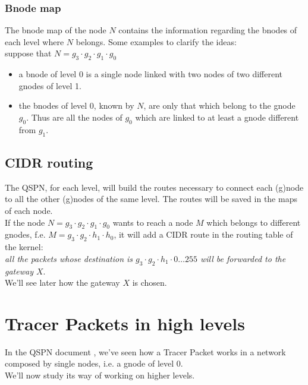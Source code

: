 \documentclass[a4paper]{article}
\begin{document}
\subsubsection{Bnode map}
The bnode map of the node $N$  contains the information regarding the bnodes
of each level where $N$ belongs.
Some examples to clarify the ideas:\\

suppose that $N = g_3\cdot g_2\cdot g_1 \cdot g_0$
\begin{itemize}
	\item a bnode of level 0 is a single node linked with two nodes of two
		different gnodes of level 1.
	\item the bnodes of level 0, known by $N$, are only that which belong
		to the gnode $g_0$. Thus are all the nodes of $g_0$ which are
		linked to at least a gnode different from $g_1$.
\end{itemize}

\subsection{CIDR routing}
The QSPN, for each level, will build the routes necessary to connect each
(g)node to all the other (g)nodes of the same level. The routes will be saved
in the maps of each node.\\

If the node $N=g_3\cdot g_2\cdot g_1 \cdot g_0$ wants to reach a node $M$ which
belongs to different gnodes, f.e. $M=g_3\cdot g_2\cdot h_1 \cdot h_0$, it will
add a CIDR\cite{CIDR} route in the routing table of the kernel:\\
\emph{all the packets whose destination is $g_3\cdot g_2\cdot h_1 \cdot 0\dots
255$ will be forwarded to the gateway $X$}.\\

We'll see later how the gateway $X$ is chosen.

\section{Tracer Packets in high levels}
In the QSPN document \cite{qspndoc}, we've seen how a Tracer Packet works in a
network composed by single nodes, i.e. a gnode of level 0. \\
We'll now study its way of working on higher levels.
\end{document}
